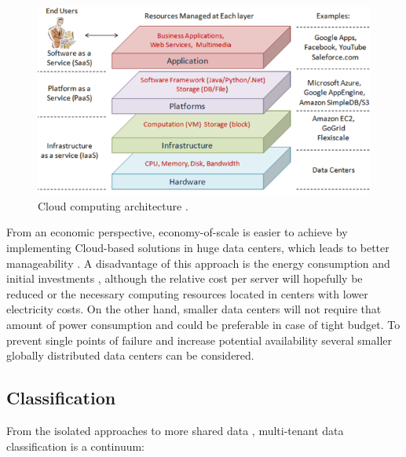 \documentclass[12pt,english]{article} %
\begin{document}
\begin{figure}[H]
  \centering
  \includegraphics[scale=0.5]{img/cloud/cloud-computing-architecture.png}
  \caption{Cloud computing architecture \cite{cloud-computing-state-of-the-art}.}
  \label{fig:cloud-computing-architecture}
\end{figure}

From an economic perspective, economy-of-scale is easier to achieve by implementing Cloud-based solutions in huge data centers, which leads to better manageability \cite{cloud-computing-state-of-the-art}.
A disadvantage of this approach is the energy consumption and initial investments \cite{cloud-computing-state-of-the-art}, although the relative cost per server will hopefully be reduced or the necessary computing resources located in centers with lower electricity costs.
On the other hand, smaller data centers will not require that amount of power consumption and could be preferable in case of tight budget.
To prevent single points of failure and increase potential availability several smaller globally distributed data centers can be considered. 



\subsection{Classification}


From the isolated approaches to more shared data \cite{multi-tenant-data-architecture}, multi-tenant data classification is a continuum:
\end{document}
